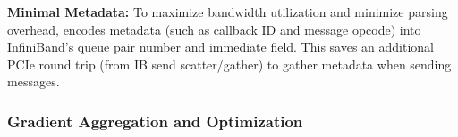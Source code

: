 \noindent \textbf{Minimal Metadata:} To maximize bandwidth utilization and minimize parsing overhead, \phub encodes metadata (such as callback ID and message opcode) into InfiniBand's queue pair number and immediate field. This saves \phub an additional PCIe round trip (from IB send scatter/gather) to gather metadata when sending messages.


\subsubsection{Gradient Aggregation and Optimization}
\label{sec:tallvswide}


